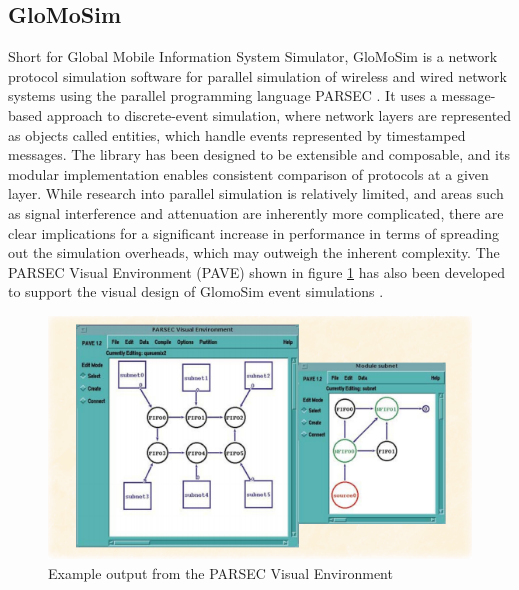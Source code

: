 \subsection{GloMoSim}
Short for Global Mobile Information System Simulator, GloMoSim is a network protocol simulation software for parallel simulation of wireless and wired network systems using the parallel programming language PARSEC \cite{zengxiang1998}. It uses a message-based approach to discrete-event simulation, where network layers are represented as objects called entities, which handle events represented by timestamped messages. The library has been designed to be extensible and composable, and its modular implementation enables consistent comparison of protocols at a given layer. While research into parallel simulation is relatively limited, and areas such as signal interference and attenuation are inherently more complicated, there are clear implications for a significant increase in performance in terms of spreading out the simulation overheads, which may outweigh the inherent complexity. The PARSEC Visual Environment (PAVE) shown in figure \ref{pave} has also been developed to support the visual design of GlomoSim event simulations \cite{luchogie2006}.

\begin{figure}
\centering	
\includegraphics[scale=0.8]{img/pave}	
\caption{Example output from the PARSEC Visual Environment}
\label{pave}
\end{figure}

